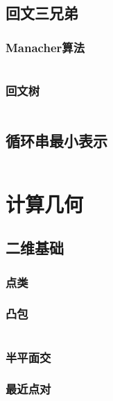 \documentclass[a4paper]{article}
\newcommand{\cppcode}[1]{
    \inputminted[mathescape]{cpp}{source/#1}
}
\begin{document}
\cppcode{string-manipulation/suffix-automation.cpp}

\subsection{回文三兄弟}

\subsubsection{Manacher算法}

\cppcode{string-manipulation/manacher.cpp}

\subsubsection{回文树}

\cppcode{string-manipulation/palindrome-tree.cpp}

\subsection{循环串最小表示}

\cppcode{string-manipulation/minimum-circular-representation.cpp}

\section{计算几何}

\subsection{二维基础}

\subsubsection{点类}

\subsubsection{凸包}

\cppcode{computational-geometry/convex-hull.cpp}

\subsubsection{半平面交}

\subsubsection{最近点对}
\end{document}
